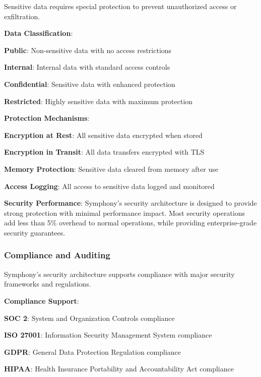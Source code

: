 Sensitive data requires special protection to prevent unauthorized access or exfiltration.

\textbf{Data Classification}:
\begin{compactlist}
    \item \textbf{Public}: Non-sensitive data with no access restrictions
    \item \textbf{Internal}: Internal data with standard access controls
    \item \textbf{Confidential}: Sensitive data with enhanced protection
    \item \textbf{Restricted}: Highly sensitive data with maximum protection
\end{compactlist}

\textbf{Protection Mechanisms}:
\begin{compactlist}
    \item \textbf{Encryption at Rest}: All sensitive data encrypted when stored
    \item \textbf{Encryption in Transit}: All data transfers encrypted with TLS
    \item \textbf{Memory Protection}: Sensitive data cleared from memory after use
    \item \textbf{Access Logging}: All access to sensitive data logged and monitored
\end{compactlist}

\begin{successbox}
\textbf{Security Performance}: Symphony's security architecture is designed to provide strong protection with minimal performance impact. Most security operations add less than 5\% overhead to normal operations, while providing enterprise-grade security guarantees.
\end{successbox}

\subsubsection*{Compliance and Auditing}

Symphony's security architecture supports compliance with major security frameworks and regulations.

\textbf{Compliance Support}:
\begin{compactlist}
    \item \textbf{SOC 2}: System and Organization Controls compliance
    \item \textbf{ISO 27001}: Information Security Management System compliance
    \item \textbf{GDPR}: General Data Protection Regulation compliance
    \item \textbf{HIPAA}: Health Insurance Portability and Accountability Act compliance
\end{compactlist}

